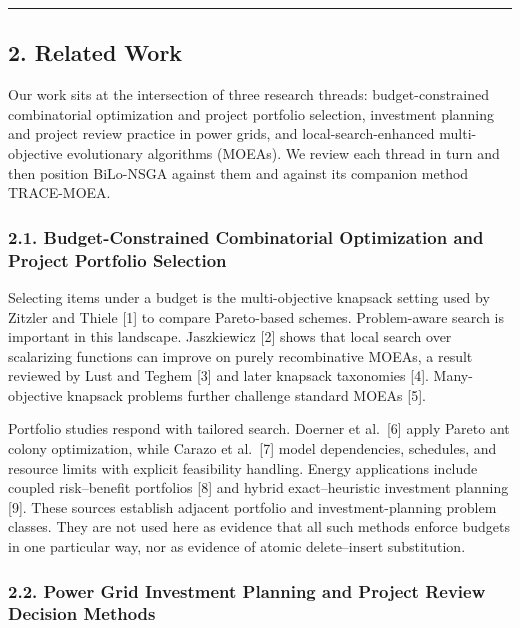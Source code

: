 \documentclass[
]{article}
\begin{document}
\begin{center}\rule{0.5\linewidth}{0.5pt}\end{center}

\subsection{2. Related Work}\label{related-work}

Our work sits at the intersection of three research threads: budget-constrained combinatorial optimization and project portfolio selection, investment planning and project review practice in power grids, and local-search-enhanced multi-objective evolutionary algorithms (MOEAs). We review each thread in turn and then position BiLo-NSGA against them and against its companion method TRACE-MOEA.

\subsubsection{2.1. Budget-Constrained Combinatorial Optimization and Project Portfolio Selection}\label{budget-constrained-combinatorial-optimization-and-project-portfolio-selection}

Selecting items under a budget is the multi-objective knapsack setting used by Zitzler and Thiele {[}1{]} to compare Pareto-based schemes. Problem-aware search is important in this landscape. Jaszkiewicz {[}2{]} shows that local search over scalarizing functions can improve on purely recombinative MOEAs, a result reviewed by Lust and Teghem {[}3{]} and later knapsack taxonomies {[}4{]}. Many-objective knapsack problems further challenge standard MOEAs {[}5{]}.

Portfolio studies respond with tailored search. Doerner et al.~{[}6{]} apply Pareto ant colony optimization, while Carazo et al.~{[}7{]} model dependencies, schedules, and resource limits with explicit feasibility handling. Energy applications include coupled risk--benefit portfolios {[}8{]} and hybrid exact--heuristic investment planning {[}9{]}. These sources establish adjacent portfolio and investment-planning problem classes. They are not used here as evidence that all such methods enforce budgets in one particular way, nor as evidence of atomic delete--insert substitution.

\subsubsection{2.2. Power Grid Investment Planning and Project Review Decision Methods}\label{power-grid-investment-planning-and-project-review-decision-methods}
\end{document}
